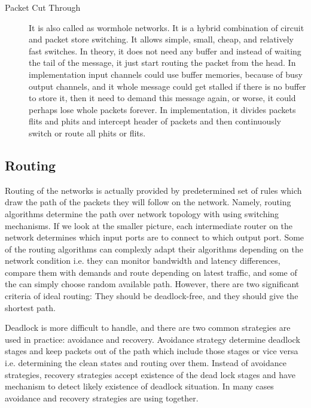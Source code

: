 \begin{description}
            \item[Packet Cut Through] It is also called as wormhole networks. It is a hybrid combination of circuit and packet store switching. It allows simple, small, cheap, and relatively fast switches. In theory, it does not need any buffer and instead of waiting the tail of the message, it just start routing the packet from the head. In implementation input channels could use buffer memories, because of busy output channels, and it whole message could get stalled if there is no buffer to store it, then it need to demand this message again, or worse, it could perhaps lose whole packets forever. In implementation, it divides packets flits and phits and intercept header of packets and then continuously switch or route all phits or flits.
        \end{description}
        \subsection{Routing}
        Routing of the networks is actually provided by predetermined set of rules which draw the path of the packets they will follow on the network. Namely, routing algorithms determine the path over network topology with using switching mechanisms. If we look at the smaller picture, each intermediate router on the network determines which input ports are to connect to which output port. Some of the routing algorithms can complexly adapt their algorithms depending on the network condition i.e. they can monitor bandwidth and latency differences, compare them with demands and route depending on latest traffic, and some of the can simply choose random available path. However, there are two significant criteria of ideal routing: They should be deadlock-free, and they should give the shortest path.

        Deadlock is more difficult to handle, and there are two common strategies are used in practice: avoidance and recovery\cite{hennessy2012computer}. Avoidance strategy determine deadlock stages and keep packets out of the path which include those stages or vice versa i.e. determining the clean states and routing over them. Instead of avoidance strategies, recovery strategies accept existence of the dead lock stages and have mechanism to detect likely existence of deadlock situation. In many cases avoidance and recovery strategies are using together. 

